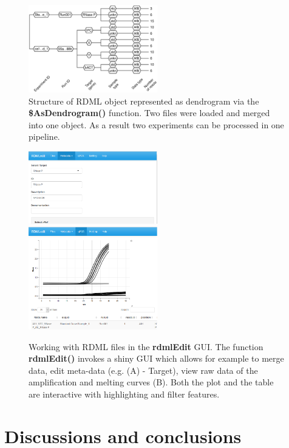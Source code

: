 \documentclass{bioinfo}
\begin{document}
\begin{figure}
	\includegraphics[width=0.5\textwidth]{as_dendrogram.eps}
	\caption{Structure of RDML object represented as dendrogram via the 
	  \textbf{\$AsDendrogram()} function. Two files 
	  were loaded and merged into one object. As a result two 
	  experiments can be processed in one pipeline.}\label{fig:01}
\end{figure}
\begin{figure}
	\includegraphics[width=0.5\textwidth]{target.PNG}
	\includegraphics[width=0.5\textwidth]{adp.PNG}
	\caption{Working with RDML files in the \textbf{rdmlEdit} GUI. 
	  The function \textbf{rdmlEdit()} invokes a shiny GUI which allows for 
	  example to merge data, edit meta-data (e.g. (A) - Target), view raw 
	  data of the amplification and melting curves (B). Both the plot and 
	  the table are interactive with highlighting and filter features.}\label{fig:02}
\end{figure}


\section{Discussions and conclusions}
	
\end{document}

